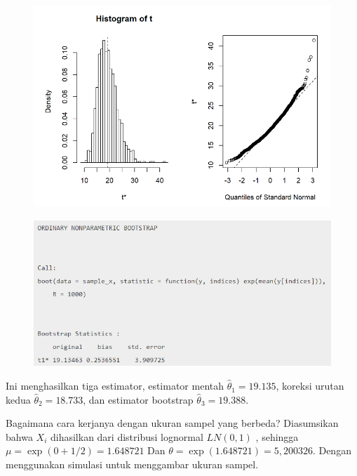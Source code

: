 \documentclass[
]{book}
\begin{document}
\begin{figure}

{\centering \includegraphics[width=1\linewidth]{images/6.2.2-1} 

}

\end{figure}

\begin{figure}

{\centering \includegraphics[width=1\linewidth]{images/6.2.2-2} 

}

\end{figure}

Ini menghasilkan tiga estimator, estimator mentah \(\widehat{\theta}_1=19.135\), koreksi urutan kedua \(\widehat{\theta}_2= 18.733\), dan estimator bootstrap \(\widehat{\theta}_3= 19.388\).

Bagaimana cara kerjanya dengan ukuran sampel yang berbeda? Diasumsikan bahwa \(X_i\) dihasilkan dari distribusi lognormal \(LN(0,1)\) , sehingga \(\mu = \exp(0 + 1/2) = 1.648721\) Dan \(\theta = \exp(1.648721)= 5,200326\). Dengan menggunakan simulasi untuk menggambar ukuran sampel.
\end{document}
